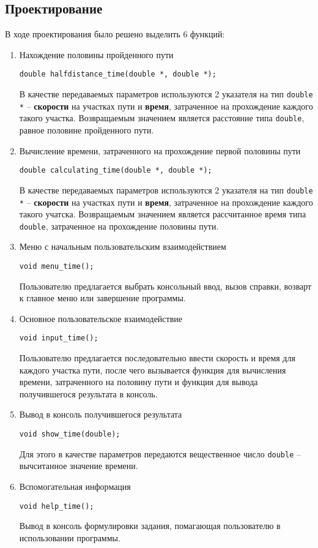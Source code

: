 \documentclass[12pt,a4paper]{report}
\begin{document}
\subsection{Проектирование}
\hspace{\parindent}В ходе проектирования было решено выделить 6 функций:
\begin{enumerate}
	\item Нахождение половины пройденного пути
	
	\verb+double halfdistance_time(double *, double *);+
	
	В качестве передаваемых параметров используются 2 указателя на тип \texttt{double *} -- \textbf{скорости}  на участках пути и \textbf{время}, затраченное на прохождение каждого такого участка. Возвращаемым значением является расстояние типа \verb+double+, равное половине пройденного пути.
		 
	\item Вычисление времени, затраченного на прохождение первой половины пути
	
	\verb+double calculating_time(double *, double *);+
	
	В качестве передаваемых параметров используются 2 указателя на тип \texttt{double *} -- \textbf{скорости}  на участках пути и \textbf{время}, затраченное на прохождение каждого такого учатска. Возвращаемым значением является рассчитанное время типа \verb+double+, затраченное на прохождение половины пути.
		 
	\item Меню с начальным пользовательским взаимодействием
	
	\verb+void menu_time();+
	
	Пользователю предлагается выбрать консольный ввод, вызов справки, возварт к главное меню или завершение программы.
	
	\item Основное пользовательское взаимодействие
	
	\verb+void input_time();+
	
	Пользователю предлагается последовательно ввести скорость и время для каждого участка пути, после чего вызывается функция для вычисления времени, затраченного на половину пути и функция для вывода получившегося результата в консоль.
	
	\item Вывод в консоль получившегося результата
	
	\verb+void show_time(double);+
	
	Для этого в качестве параметров передаются вещественное число \texttt{double} -- вычситанное значение времени.

	\item Вспомогательная информация
	
	\verb+void help_time();+
	
	Вывод в консоль формулировки задания, помагающая пользователю в использовании программы.
\end{enumerate}
\end{document}

